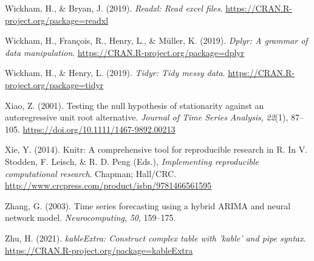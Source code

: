 \documentclass[
]{article}
\newlength{\cslhangindent}
\newlength{\cslentryspacingunit} %
\newenvironment{CSLReferences}[2] %
 {%
  \setlength{\parindent}{0pt}
  \ifodd #1
  \let\oldpar\par
  \def\par{\hangindent=\cslhangindent\oldpar}
  \fi
  \setlength{\parskip}{#2\cslentryspacingunit}
 }%
 {}
\begin{document}
\begin{CSLReferences}{1}{0}
\leavevmode{}%
Wickham, H., \& Bryan, J. (2019). \emph{Readxl: Read excel files}.
\url{https://CRAN.R-project.org/package=readxl}

\leavevmode{}%
Wickham, H., François, R., Henry, L., \& Müller, K. (2019). \emph{Dplyr:
A grammar of data manipulation}.
\url{https://CRAN.R-project.org/package=dplyr}

\leavevmode{}%
Wickham, H., \& Henry, L. (2019). \emph{Tidyr: Tidy messy data}.
\url{https://CRAN.R-project.org/package=tidyr}

\leavevmode{}%
Xiao, Z. (2001). Testing the null hypothesis of stationarity against an
autoregressive unit root alternative. \emph{Journal of Time Series
Analysis}, \emph{22}(1), 87--105.
\url{https://doi.org/10.1111/1467-9892.00213}

\leavevmode{}%
Xie, Y. (2014). Knitr: A comprehensive tool for reproducible research in
{R}. In V. Stodden, F. Leisch, \& R. D. Peng (Eds.), \emph{Implementing
reproducible computational research}. Chapman; Hall/CRC.
\url{http://www.crcpress.com/product/isbn/9781466561595}

\leavevmode{}%
Zhang, G. (2003). Time series forecasting using a hybrid ARIMA and
neural network model. \emph{Neurocomputing}, \emph{50}, 159--175.

\leavevmode{}%
Zhu, H. (2021). \emph{kableExtra: Construct complex table with 'kable'
and pipe syntax}. \url{https://CRAN.R-project.org/package=kableExtra}

\end{CSLReferences}
\end{document}
